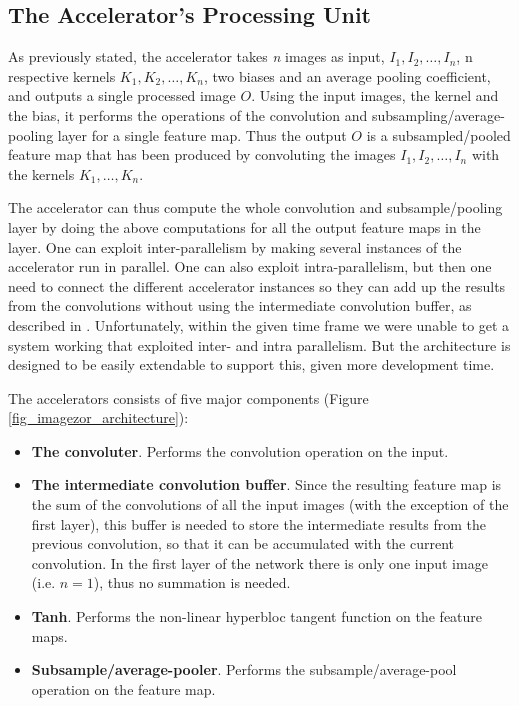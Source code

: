 \subsection{The Accelerator's Processing Unit}

As previously stated, the accelerator takes \textit{n} images as input, $ I_1, I_2, \dots, I_n $, n respective kernels $ K_1, K_2, \dots, K_n $, two biases and an average pooling coefficient, and outputs a single processed image $ O $. Using the input images, the kernel and the bias, it performs the operations of the convolution and subsampling/average-pooling layer for a single feature map. Thus the output $ O $ is a subsampled/pooled feature map that has been produced by convoluting the images $ I_1, I_2, \dots, I_n $ with the kernels $ K_1, \dots, K_n $. 

The accelerator can thus compute the whole convolution and subsample/pooling layer by doing the above computations for all the output feature maps in the layer. One can exploit inter-parallelism by making several instances of the accelerator run in parallel. One can also exploit intra-parallelism, but then one need to connect the different accelerator instances so they can add up the results from the convolutions without using the intermediate convolution buffer, as described in \cite{Chakradhar2010}. Unfortunately, within the given time frame we were unable to get a system working that exploited inter- and intra parallelism. But the architecture is designed to be easily extendable to support this, given more development time. 


The accelerators consists of five major components (Figure \ref{fig_imagezor_architecture}):

\begin{itemize}
	\item \textbf{The convoluter}. Performs the convolution operation on the input.
	\item \textbf{The intermediate convolution buffer}. Since the resulting feature map is the sum of the convolutions of all the input images (with the exception of the first layer), this buffer is needed to store the intermediate results from the previous convolution, so that it can be accumulated with the current convolution. In the first layer of the network there is only one input image (i.e. $ n = 1 $), thus no summation is needed.
	\item \textbf{Tanh}. Performs the non-linear hyperbloc tangent function  on the feature maps.
	\item \textbf{Subsample/average-pooler}. Performs the subsample/average-pool operation on the feature map. 
\end{itemize}

